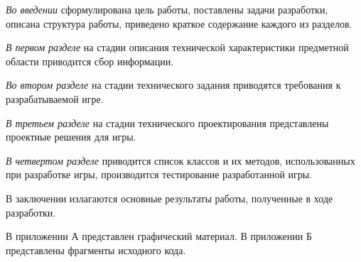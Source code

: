 \emph{Во введении} сформулирована цель работы, поставлены задачи разработки, описана структура работы, приведено краткое содержание каждого из разделов.

\emph{В первом разделе} на стадии описания технической характеристики предметной области приводится сбор информации.

\emph{Во втором разделе} на стадии технического задания приводятся требования к разрабатываемой игре.

\emph{В третьем разделе} на стадии технического проектирования представлены проектные решения для игры.

\emph{В четвертом разделе} приводится список классов и их методов, использованных при разработке игры, производится тестирование разработанной игры.

В заключении излагаются основные результаты работы, полученные в ходе разработки.

В приложении А представлен графический материал.
В приложении Б представлены фрагменты исходного кода. 
